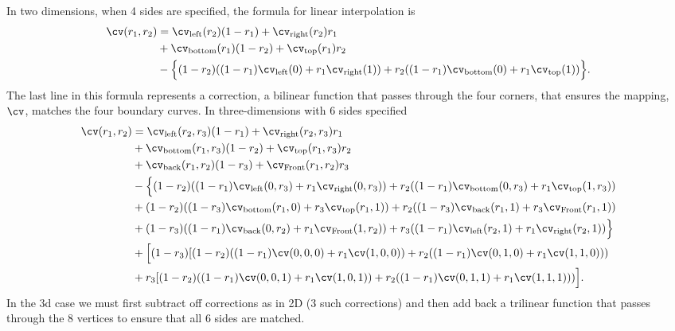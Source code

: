 In two dimensions, when 4 sides are specified, the formula for linear interpolation is
\begin{align*}
    \cv(r_1,r_2) & = \cvLeft(r_2) (1-r_1) + \cvRight(r_2) r_1 \\
                 & + \cvBottom(r_1)(1-r_2) + \cvTop(r_1) r_2  \\  
                 & -\Big\{ (1-r_2)( (1-r_1)\cvLeft(0) + r_1 \cvRight(1) ) 
                          +   r_2( (1-r_1)\cvBottom(0) + r_1 \cvTop(1) ) \Big\}.
\end{align*}
The last line in this formula represents a correction, a bilinear function that passes through the
four corners, that ensures the mapping, $\cv$, matches the four boundary curves.
In three-dimensions with 6 sides specified
\begin{align*}
    \cv(r_1,r_2) & = \cvLeft(r_2,r_3) (1-r_1) + \cvRight(r_2,r_3) r_1 \\
                 & + \cvBottom(r_1,r_3)(1-r_2)  +   \cvTop(r_1,r_3) r_2  \\  
                 & + \cvBack(r_1,r_2)(1-r_3)  +   \cvFront(r_1,r_2) r_3  \\  
                 & -\Big\{ (1-r_2)( (1-r_1)\cvLeft(0,r_3) + r_1 \cvRight(0,r_3) )  
                           +    r_2( (1-r_1)\cvBottom(0,r_3) + r_1 \cvTop(1,r_3) )   \\  
                 &         + (1-r_2)( (1-r_3)\cvBottom(r_1,0) + r_3 \cvTop(r_1,1) )      
                           +    r_2( (1-r_3)\cvBack(r_1,1) + r_3 \cvFront(r_1,1) )   \\  
                 &         + (1-r_3)( (1-r_1)\cvBack(0,r_2) + r_1 \cvFront(1,r_2) )      
                           +    r_3( (1-r_1)\cvLeft(r_2,1) + r_1 \cvRight(r_2,1) )  \Big\}  \\  
                 & +\Big[ (1-r_3)[ (1-r_2)( (1-r_1)\cv(0,0,0) + r_1 \cv(1,0,0) )      
                                     + r_2 ( (1-r_1)\cv(0,1,0) + r_1 \cv(1,1,0)) )   \\  
                 &           +r_3 [ (1-r_2)( (1-r_1)\cv(0,0,1) + r_1 \cv(1,0,1) )      
                                     + r_2 ( (1-r_1)\cv(0,1,1) + r_1 \cv(1,1,1)) )   \Big].
\end{align*}
In the 3d case we must first subtract off corrections as in 2D (3 such corrections) and then
add back a trilinear function that passes through the 8 vertices to ensure that all 6 sides are
matched.

